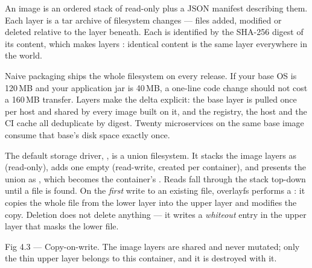 
 An image is an ordered stack of read-only  plus a JSON manifest describing them. Each layer is a tar archive of filesystem changes --- files added, modified or deleted relative to the layer beneath. Each is identified by the SHA-256 digest of its content, which makes layers : identical content is the same layer everywhere in the world.

 Naive packaging ships the whole filesystem on every release. If your base OS is 120\,MB and your application jar is 40\,MB, a one-line code change should not cost a 160\,MB transfer. Layers make the delta explicit: the base layer is pulled once per host and shared by every image built on it, and the registry, the host and the CI cache all deduplicate by digest. Twenty microservices on the same base image consume that base's disk space exactly once.

 The default storage driver, , is a union filesystem. It stacks the image layers as  (read-only), adds one empty  (read-write, created per container), and presents the union as , which becomes the container's \code{/}. Reads fall through the stack top-down until a file is found. On the \emph{first} write to an existing file, overlayfs performs a : it copies the whole file from the lower layer into the upper layer and modifies the copy. Deletion does not delete anything --- it writes a \emph{whiteout} entry in the upper layer that masks the lower file.

\begin{wbfigure}{Fig 4.3 — Copy-on-write. The image layers are shared and never mutated; only the thin upper layer belongs to this container, and it is destroyed with it.}
\end{wbfigure}

